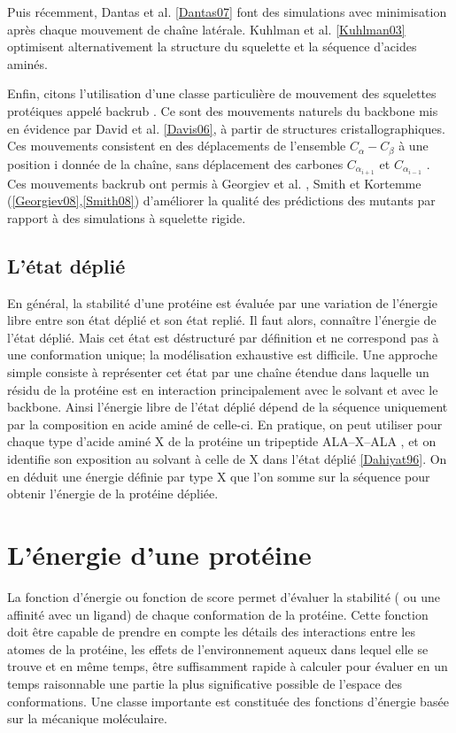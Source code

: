 Puis récemment, Dantas et al. \ref{Dantas07} font des simulations avec minimisation après chaque mouvement de chaîne latérale. Kuhlman et al. \ref{Kuhlman03}  optimisent alternativement la structure du squelette et la séquence d'acides aminés.

Enfin, citons l'utilisation d'une classe particulière de mouvement des squelettes protéiques appelé \og backrub \fg. Ce sont des mouvements naturels du backbone mis en évidence par David et al. \ref{Davis06}, à partir de structures cristallographiques. Ces mouvements consistent en des déplacements de l'ensemble $C_{\alpha}-C_{\beta}$ à une position i donnée de la chaîne, sans déplacement des carbones $C_{\alpha_{i+1}}$ et $C_{\alpha_{i-1}}$ . Ces mouvements backrub ont permis à Georgiev et al. , Smith et Kortemme (\ref{Georgiev08},\ref{Smith08}) d'améliorer la qualité des prédictions des mutants par rapport à des simulations à squelette rigide.

\subsection{L'état déplié }
En général, la stabilité d'une protéine est évaluée par une variation de l'énergie libre entre son état déplié et son état replié. Il faut alors, connaître l'énergie de l'état déplié. Mais cet état est déstructuré par définition et ne correspond pas à une conformation unique; la modélisation exhaustive est difficile. Une approche simple consiste à représenter cet état par une chaîne étendue dans laquelle un résidu de la protéine est en interaction principalement avec le solvant et avec le backbone. Ainsi l'énergie libre de l'état déplié dépend de la séquence uniquement par la composition en acide aminé de celle-ci. En pratique, on peut utiliser pour chaque type d'acide aminé X de la protéine  un tripeptide ALA--X--ALA , et on identifie son exposition au solvant à celle de X dans l'état déplié \ref{Dahiyat96}. On en déduit une énergie définie par type X que l'on somme sur la séquence pour obtenir l'énergie de la protéine dépliée. 

\section{L'énergie d'une protéine}

La fonction d'énergie ou fonction de score permet d'évaluer la stabilité ( ou une affinité avec un ligand) de chaque conformation de la protéine. Cette fonction doit être capable de prendre en compte les détails des interactions entre les atomes de la protéine, les effets de l'environnement aqueux  dans lequel elle se trouve et en même temps, être suffisamment rapide à calculer pour évaluer en un temps raisonnable une partie la plus significative possible de l'espace des conformations. Une classe importante est constituée des fonctions d'énergie basée sur la mécanique moléculaire.

